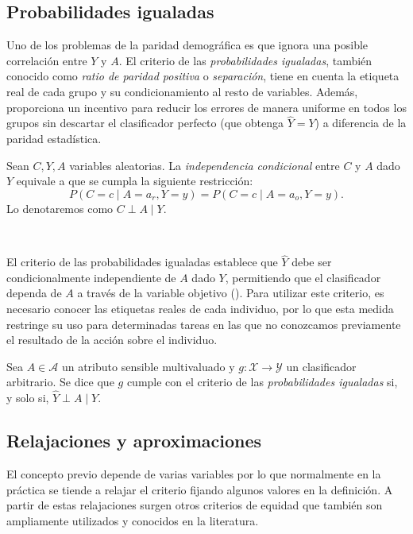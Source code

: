 \documentclass[oneside,openright,titlepage,numbers=noenddot,openany,headinclude,footinclude=true,
cleardoublepage=empty,abstractoff,BCOR=5mm,paper=a4,fontsize=12pt,main=spanish]{scrreprt}
\begin{document}
\subsection{Probabilidades igualadas}

Uno de los problemas de la paridad demográfica es que ignora una posible correlación entre $Y$ y $A$. El criterio de las \textit{probabilidades igualadas}, también conocido como \textit{ratio de paridad positiva} o \textit{separación}, tiene en cuenta la etiqueta real de cada grupo y su condicionamiento al resto de variables. Además, proporciona un incentivo para reducir los errores de manera uniforme en todos los grupos sin descartar el clasificador perfecto (que obtenga $\hat{Y}=Y$) a diferencia de la paridad estadística.\\

\begin{definition}
Sean $C,Y,A$ variables aleatorias. La \textit{independencia condicional} entre $C$ y $A$ dado $Y$ equivale a que se cumpla la siguiente restricción:
$$P(C=c \mid A=a_r, Y=y)=P(C=c \mid A=a_o,Y=y).$$
Lo denotaremos como $C \perp A \mid Y.$
\end{definition}\

El criterio de las probabilidades igualadas establece que $\hat{Y}$ debe ser condicionalmente independiente de $A$ dado $Y$, permitiendo que el clasificador dependa de $A$ a través de la variable objetivo (\cite{eodd2016}). Para utilizar este criterio, es necesario conocer las etiquetas reales de cada individuo, por lo que esta medida restringe su uso para determinadas tareas en las que no conozcamos previamente el resultado de la acción sobre el individuo.\\

\begin{definition} \label{def:probigual}
Sea $A \in \mathcal{A}$ un atributo sensible multivaluado y $g\colon \mathcal{X} \to \mathcal{Y}$ un clasificador arbitrario. Se dice que $g$ cumple con el criterio de las \textit{probabilidades igualadas} si, y solo si, $\hat{Y} \perp A \mid Y$.
\end{definition}

\subsection*{Relajaciones y aproximaciones}

El concepto previo depende de varias variables por lo que normalmente en la práctica se tiende a relajar el criterio fijando algunos valores en la definición. A partir de estas relajaciones surgen otros criterios de equidad que también son ampliamente utilizados y conocidos en la literatura.
\end{document}
